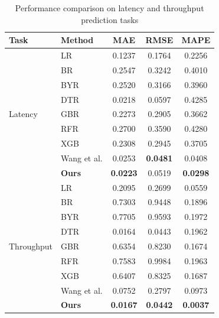 \documentclass[a4paper,fleqn]{cas-dc}
\begin{document}
\begin{table}
	\centering
	\caption{Performance comparison on latency and throughput prediction tasks}
	\setlength{\tabcolsep}{4pt}
	\small
	\label{tab:performance}
	\begin{tabular}{@{}llccc@{}}
		\toprule
		\textbf{Task} & \textbf{Method} & \textbf{MAE} & \textbf{RMSE} & \textbf{MAPE} \\
		\midrule
		\multirow{9}{*}{Latency} 
		& LR & 0.1237 & 0.1764 & 0.2256 \\
		& BR & 0.2547 & 0.3242 & 0.4010 \\
		& BYR & 0.2520 & 0.3166 & 0.3960 \\
		& DTR & 0.0218 & 0.0597 & 0.4285 \\
		& GBR & 0.2273 & 0.2905 & 0.3662 \\
		& RFR & 0.2700 & 0.3590 & 0.4280 \\
		& XGB & 0.2308 & 0.2945 & 0.3705 \\
		& Wang et al. & 0.0253 & \textbf{0.0481} & 0.0408 \\
		& \textbf{Ours} & \textbf{0.0223} & 0.0519 & \textbf{0.0298} \\
		\midrule
		\multirow{9}{*}{Throughput} 
		& LR & 0.2095 & 0.2699 & 0.0559 \\
		& BR & 0.7303 & 0.9448 & 0.1896 \\
		& BYR & 0.7705 & 0.9593 & 0.1972 \\
		& DTR & 0.0164 & 0.0443 & 0.1962 \\
		& GBR & 0.6354 & 0.8230 & 0.1674 \\
		& RFR & 0.7583 & 0.9984 & 0.1963 \\
		& XGB & 0.6407 & 0.8325 & 0.1687 \\
		& Wang et al. & 0.0752 & 0.2797 & 0.0973 \\
		& \textbf{Ours} & \textbf{0.0167} & \textbf{0.0442} & \textbf{0.0037} \\
		\bottomrule
	\end{tabular}
\end{table}

\end{document}
